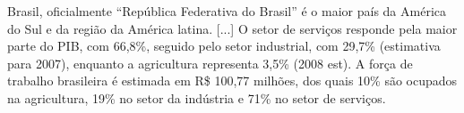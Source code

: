 \documentclass{article}
\begin{document}


Brasil, oficialmente ``República Federativa do Brasil''  é o maior país da
América do Sul e da região da América latina. [...] O setor de serviços responde pela
maior parte do PIB, com 66,8\%, seguido pelo setor industrial, com 29,7\%
(estimativa para 2007), enquanto a agricultura representa 3,5\% (2008 est). A
força de trabalho brasileira é estimada em R\$ 100,77 milhões, dos quais 10\%
são ocupados na agricultura, 19\% no setor da indústria e 71\% no setor de
serviços.
\end{document}
